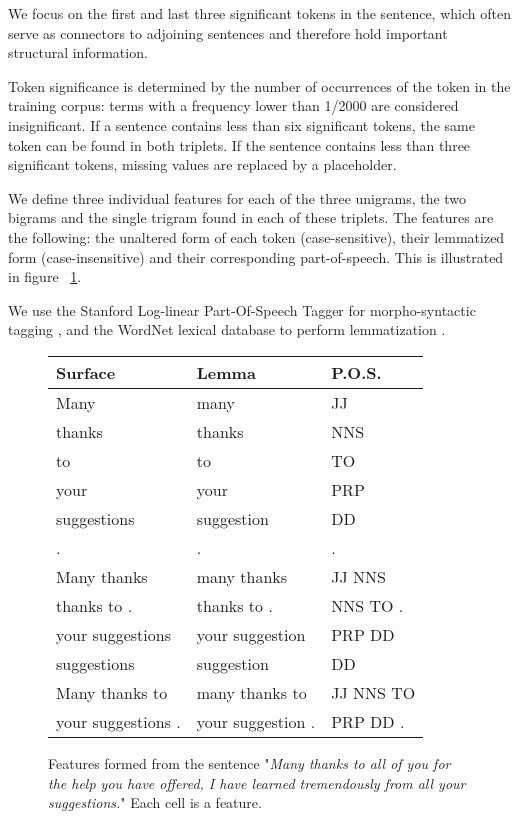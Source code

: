 We focus on the first and last three significant tokens in the sentence, which often serve as connectors to adjoining sentences and therefore hold important structural information.

Token significance is determined by the number of occurrences of the token in the training corpus: terms with a frequency lower than 1/2000 are considered insignificant. If a sentence contains less than six significant tokens, the same token can be found in both triplets. If the sentence contains less than three significant tokens, missing values are replaced by a placeholder.

We define three individual features for each of the three unigrams, the two bigrams and the single trigram found in each of these triplets. The features are the following: the unaltered form of each token (case-sensitive), their lemmatized form (case-insensitive) and their corresponding part-of-speech. This is illustrated in figure ~\ref{fig:exampleSyntacticFeatures}.

We use the Stanford Log-linear Part-Of-Speech Tagger for morpho-syntactic tagging \cite{toutanova2003feature}, and the WordNet lexical database to perform lemmatization \cite{miller1995wordnet}.

\begin{figure}\small\centering
\begin{tabular}{*{2}{|l}|l|}
\toprule
\textbf{Surface} & \textbf{Lemma} & \textbf{P.O.S.}\\
	\midrule
	Many & many & JJ\\
	thanks & thanks & NNS\\
	to & to & TO\\
	your & your & PRP\\
	suggestions & suggestion & DD\\
	. & . & .\\
	Many thanks & many thanks & JJ NNS\\
	thanks to . & thanks to . & NNS TO . \\
	your suggestions & your suggestion & PRP DD\\
	suggestions & suggestion & DD\\
	Many thanks to & many thanks to & JJ NNS TO\\
	your suggestions . & your suggestion . & PRP DD .\\
	\bottomrule
\end{tabular}

\caption{Features formed from the sentence "\textit{Many thanks to all of you for the help you have offered, I have learned tremendously from all your suggestions.}" Each cell is a feature.}
\label{fig:exampleSyntacticFeatures}
\end{figure}

